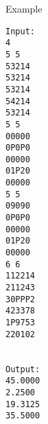 Example  
\begin{verbatim}
Input:
4
5 5
53214
53214
53214
54214
53214
5 5
00000
0P0P0
00000
01P20
00000
5 5
09090
0P0P0
00000
01P20
00000
6 6
112214
211243
30PPP2
423378
1P9753
220102


Output:
45.0000
2.2500
19.3125
35.5000

\end{verbatim}